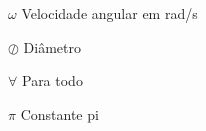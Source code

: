 \begin{simbolos}
  \item[$ \omega $] Velocidade angular em rad/s
  \item[$\oslash $] Diâmetro
  \item[$\forall$]  Para todo
  \item[$ \pi $] Constante pi
  
 
\end{simbolos}
